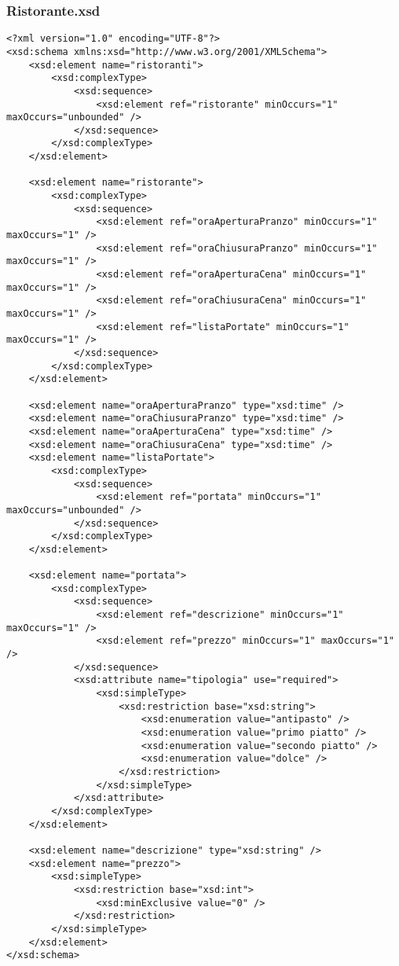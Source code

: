 \documentclass [a4paper, 12pt]{book}
\begin{document}
\subsubsection{Ristorante.xsd}
\begin{lstlisting}[style=XML]
<?xml version="1.0" encoding="UTF-8"?>
<xsd:schema xmlns:xsd="http://www.w3.org/2001/XMLSchema">
    <xsd:element name="ristoranti">
        <xsd:complexType>
            <xsd:sequence>
                <xsd:element ref="ristorante" minOccurs="1" maxOccurs="unbounded" />
            </xsd:sequence>
        </xsd:complexType>
    </xsd:element>

    <xsd:element name="ristorante">
        <xsd:complexType>
            <xsd:sequence>
                <xsd:element ref="oraAperturaPranzo" minOccurs="1" maxOccurs="1" />
                <xsd:element ref="oraChiusuraPranzo" minOccurs="1" maxOccurs="1" />
                <xsd:element ref="oraAperturaCena" minOccurs="1" maxOccurs="1" />
                <xsd:element ref="oraChiusuraCena" minOccurs="1" maxOccurs="1" />
                <xsd:element ref="listaPortate" minOccurs="1" maxOccurs="1" />
            </xsd:sequence>
        </xsd:complexType>
    </xsd:element>

    <xsd:element name="oraAperturaPranzo" type="xsd:time" />
    <xsd:element name="oraChiusuraPranzo" type="xsd:time" />
    <xsd:element name="oraAperturaCena" type="xsd:time" />
    <xsd:element name="oraChiusuraCena" type="xsd:time" />
    <xsd:element name="listaPortate">
        <xsd:complexType>
            <xsd:sequence>
                <xsd:element ref="portata" minOccurs="1" maxOccurs="unbounded" />
            </xsd:sequence>
        </xsd:complexType>
    </xsd:element>

    <xsd:element name="portata">
        <xsd:complexType>
            <xsd:sequence>
                <xsd:element ref="descrizione" minOccurs="1" maxOccurs="1" />
                <xsd:element ref="prezzo" minOccurs="1" maxOccurs="1" />
            </xsd:sequence>
            <xsd:attribute name="tipologia" use="required">
                <xsd:simpleType>
                    <xsd:restriction base="xsd:string">
                        <xsd:enumeration value="antipasto" />
                        <xsd:enumeration value="primo piatto" />
                        <xsd:enumeration value="secondo piatto" />
                        <xsd:enumeration value="dolce" />
                    </xsd:restriction>
                </xsd:simpleType>
            </xsd:attribute>
        </xsd:complexType>
    </xsd:element>

    <xsd:element name="descrizione" type="xsd:string" />
    <xsd:element name="prezzo">
        <xsd:simpleType>
            <xsd:restriction base="xsd:int">
                <xsd:minExclusive value="0" />
            </xsd:restriction>
        </xsd:simpleType>
    </xsd:element>
</xsd:schema>
\end{lstlisting}
\end{document}
